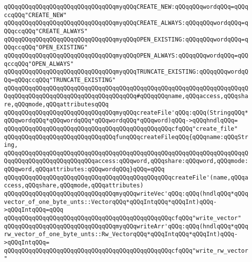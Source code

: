 \verb|qQQqqQQqqQQqqQQqqQQqqQQqqQQqqQQqmyqQQqCREATE_NEW:qQQqqQQqwordqQQq=qQQqccqQQq"CREATE_NEW"|\newline
\verb|qQQqqQQqqQQqqQQqqQQqqQQqqQQqqQQqmyqQQqCREATE_ALWAYS:qQQqqQQqwordqQQq=qQQqccqQQq"CREATE_ALWAYS"|\newline
\verb|qQQqqQQqqQQqqQQqqQQqqQQqqQQqqQQqmyqQQqOPEN_EXISTING:qQQqqQQqwordqQQq=qQQqccqQQq"OPEN_EXISTING"|\newline
\verb|qQQqqQQqqQQqqQQqqQQqqQQqqQQqqQQqmyqQQqOPEN_ALWAYS:qQQqqQQqwordqQQq=qQQqccqQQq"OPEN_ALWAYS"|\newline
\verb|qQQqqQQqqQQqqQQqqQQqqQQqqQQqqQQqmyqQQqTRUNCATE_EXISTING:qQQqqQQqwordqQQq=qQQqccqQQq"TRUNCATE_EXISTING"|\newline
\newline
\verb|qQQqqQQqqQQqqQQqqQQqqQQqqQQqqQQqqQQqqQQqqQQqqQQqqQQqqQQqqQQqqQQqqQQqqQQqqQQqqQQqqQQqqQQqqQQqqQQqqQQqqQQqqQQq#qQQqqQQqname,qQQqaccess,qQQqshare,qQQqmode,qQQqattributesqQQq|\newline
\verb|qQQqqQQqqQQqqQQqqQQqqQQqqQQqqQQqmyqQQqcreateFile'qQQq:qQQq(StringqQQq*qQQqwordqQQq*qQQqwordqQQq*qQQqwordqQQq*qQQqword)qQQq->qQQqhndlqQQq=|\newline
\verb|qQQqqQQqqQQqqQQqqQQqqQQqqQQqqQQqqQQqqQQqqQQqqQQqcfqQQq"create_file"|\newline
\newline
\verb|qQQqqQQqqQQqqQQqqQQqqQQqqQQqqQQqfunqQQqcreateFileqQQq{qQQqname:qQQqString,|\newline
\verb|qQQqqQQqqQQqqQQqqQQqqQQqqQQqqQQqqQQqqQQqqQQqqQQqqQQqqQQqqQQqqQQqqQQqqQQqqQQqqQQqqQQqqQQqqQQqqQQqaccess:qQQqword,qQQqshare:qQQqword,qQQqmode:qQQqword,qQQqattributes:qQQqwordqQQq}qQQq=qQQq|\newline
\verb|qQQqqQQqqQQqqQQqqQQqqQQqqQQqqQQqqQQqqQQqqQQqqQQqcreateFile'(name,qQQqaccess,qQQqshare,qQQqmode,qQQqattributes)|\newline
\newline
\verb|qQQqqQQqqQQqqQQqqQQqqQQqqQQqqQQqmyqQQqwriteVec'qQQq:qQQq(hndlqQQq*qQQqvector_of_one_byte_unts::VectorqQQq*qQQqIntqQQq*qQQqInt)qQQq->qQQqIntqQQq=qQQq|\newline
\verb|qQQqqQQqqQQqqQQqqQQqqQQqqQQqqQQqqQQqqQQqqQQqqQQqcfqQQq"write_vector"|\newline
\verb|qQQqqQQqqQQqqQQqqQQqqQQqqQQqqQQqmyqQQqwriteArr'qQQq:qQQq(hndlqQQq*qQQqrw_vector_of_one_byte_unts::Rw_VectorqQQq*qQQqIntqQQq*qQQqInt)qQQq->qQQqIntqQQq=|\newline
\verb|qQQqqQQqqQQqqQQqqQQqqQQqqQQqqQQqqQQqqQQqqQQqqQQqcfqQQq"write_rw_vector"|\newline
